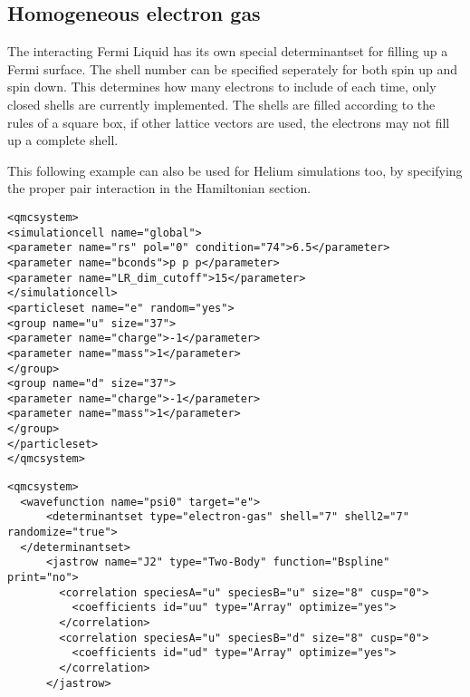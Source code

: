 \subsection{Homogeneous electron gas}
\label{sec:hegbasis}

The interacting Fermi Liquid has its own special determinantset for filling up a
Fermi surface.  The shell number can be specified seperately for both spin up and spin down.
This determines how many electrons to include of each time, only closed shells are currently
implemented.  The shells are filled according to the rules of a square box, if other lattice
vectors are used, the electrons may not fill up a complete shell.

This following example can also be used for Helium simulations too, by specifying the
proper pair interaction in the Hamiltonian section. 

\begin{lstlisting}[caption=2D Fermi Liquid example: particle specification ]
<qmcsystem>
<simulationcell name="global">
<parameter name="rs" pol="0" condition="74">6.5</parameter>
<parameter name="bconds">p p p</parameter>
<parameter name="LR_dim_cutoff">15</parameter>
</simulationcell>
<particleset name="e" random="yes">
<group name="u" size="37">
<parameter name="charge">-1</parameter>
<parameter name="mass">1</parameter>
</group>
<group name="d" size="37">
<parameter name="charge">-1</parameter>
<parameter name="mass">1</parameter>
</group>
</particleset>
</qmcsystem>
\end{lstlisting}

\begin{lstlisting}[caption=2D Fermi Liquid example (Slater Jastrow wave function) ]
<qmcsystem>
  <wavefunction name="psi0" target="e">
      <determinantset type="electron-gas" shell="7" shell2="7" randomize="true">
  </determinantset>
      <jastrow name="J2" type="Two-Body" function="Bspline" print="no">
        <correlation speciesA="u" speciesB="u" size="8" cusp="0">
          <coefficients id="uu" type="Array" optimize="yes"> 
        </correlation>
        <correlation speciesA="u" speciesB="d" size="8" cusp="0">
          <coefficients id="ud" type="Array" optimize="yes"> 
        </correlation>
      </jastrow>
\end{lstlisting}

